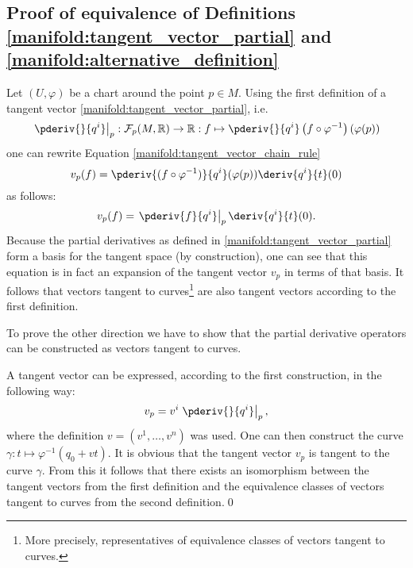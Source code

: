 \subsection{Proof of equivalence of Definitions \ref{manifold:tangent_vector_partial} and \ref{manifold:alternative_definition}}

    Let $(U,\varphi)$ be a chart around the point $p\in M$. Using the first definition of a tangent vector \ref{manifold:tangent_vector_partial}, i.e. \[\left.\pderiv{}{q^i}\right|_{p}:\mathcal{F}_p(M, \mathbb{R})\rightarrow\mathbb{R}:f\mapsto \pderiv{}{q^i}\left(f\circ\varphi^{-1}\right)(\varphi(p))\] one can rewrite Equation \eqref{manifold:tangent_vector_chain_rule} \[v_p(f) = \pderiv{(f\circ\varphi^{-1})}{q^i}(\varphi(p))\deriv{q^i}{t}(0)\] as follows: \[v_p(f) = \left.\pderiv{f}{q^i}\right|_p\deriv{q^i}{t}(0).\] Because the partial derivatives as defined in \ref{manifold:tangent_vector_partial} form a basis for the tangent space (by construction), one can see that this equation is in fact an expansion of the tangent vector $v_p$ in terms of that basis. It follows that vectors tangent to curves\footnote{More precisely, representatives of equivalence classes of vectors tangent to curves.} are also tangent vectors according to the first definition.

    To prove the other direction we have to show that the partial derivative operators can be constructed as vectors tangent to curves.

    A tangent vector can be expressed, according to the first construction, in the following way: \[v_p = v^i\left.\pderiv{}{q^i}\right|_p,\] where the definition $v = (v^1,\ldots,v^n)$ was used. One can then construct the curve $\gamma:t\mapsto\varphi^{-1}(q_0+vt)$. It is obvious that the tangent vector $v_p$ is tangent to the curve $\gamma$. From this it follows that there exists an isomorphism between the tangent vectors from the first definition and the equivalence classes of vectors tangent to curves from the second definition.\qed

